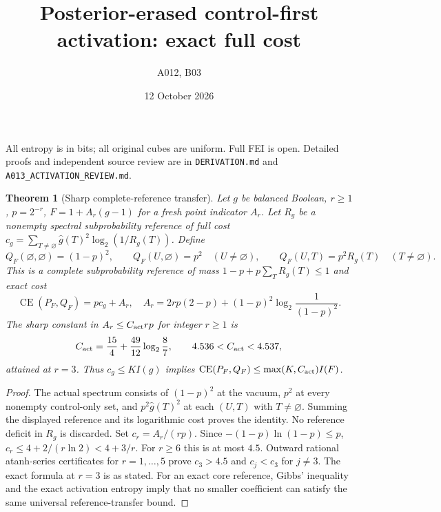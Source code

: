 \documentclass[11pt]{article}
\newtheorem{theorem}{Theorem}
\begin{document}
\title{Posterior-erased control-first activation: exact full cost}
\author{A012, B03}\date{12 October 2026}\maketitle
All entropy is in bits; all original cubes are uniform. Full FEI is open.
Detailed proofs and independent source review are in \texttt{DERIVATION.md}
and \texttt{A013\_ACTIVATION\_REVIEW.md}.

\begin{theorem}[Sharp complete-reference transfer]
Let $g$ be balanced Boolean, $r\ge1$, $p=2^{-r}$,
$F=1+A_r(g-1)$ for a fresh point indicator $A_r$.
Let $R_g$ be a nonempty spectral subprobability reference of full cost
$c_g=\sum_{T\ne\varnothing}\widehat g(T)^2\log_2(1/R_g(T))$.
Define
\[
Q_F(\varnothing,\varnothing)=(1-p)^2,\qquad
Q_F(U,\varnothing)=p^2\quad(U\ne\varnothing),\qquad
Q_F(U,T)=p^2R_g(T)\quad(T\ne\varnothing).
\]
This is a complete subprobability reference of mass
$1-p+p\sum_T R_g(T)\le1$ and exact cost
\[
\operatorname{CE}(P_F,Q_F)=pc_g+A_r,\quad
A_r=2rp(2-p)+(1-p)^2\log_2\frac1{(1-p)^2}.
\]
The sharp constant in $A_r\le C_{\rm act}rp$ for integer $r\ge1$ is
\[
C_{\rm act}=\frac{15}{4}+\frac{49}{12}\log_2\frac87,
\qquad 4.536<C_{\rm act}<4.537,
\]
attained at $r=3$. Thus $c_g\le K I(g)$ implies
$\operatorname{CE}(P_F,Q_F)\le\max(K,C_{\rm act})I(F)$.
\end{theorem}
\begin{proof}
The actual spectrum consists of $(1-p)^2$ at the vacuum,
$p^2$ at every nonempty control-only set, and
$p^2\widehat g(T)^2$ at each $(U,T)$ with $T\ne\varnothing$.
Summing the displayed reference and its logarithmic cost proves the
identity. No reference deficit in $R_g$ is discarded.
Set $c_r=A_r/(rp)$. Since $-(1-p)\ln(1-p)\le p$,
$c_r\le4+2/(r\ln2)<4+3/r$. For $r\ge6$ this is at most $4.5$.
Outward rational atanh-series certificates for $r=1,\ldots,5$ prove
$c_3>4.5$ and $c_j<c_3$ for $j\ne3$.
The exact formula at $r=3$ is as stated. For an exact core reference,
Gibbs' inequality and the exact activation entropy imply that no smaller
coefficient can satisfy the same universal reference-transfer bound.
\end{proof}
\end{document}
